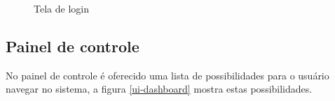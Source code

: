 \begin{figure}[H]
\caption{\label{ui-login} Tela de login}
\end{figure}

\subsection{Painel de controle}
No painel de controle é oferecido uma lista de possibilidades para o usuário navegar no sistema, a figura \ref{ui-dashboard} mostra estas possibilidades.

